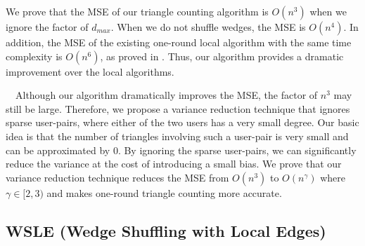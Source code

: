We prove that the MSE of our triangle counting algorithm is
$O(n^3)$ when we ignore the factor of $d_{max}$.
When we do not shuffle wedges, the
MSE is
$O(n^4)$.
In addition, the MSE of the existing one-round local algorithm \cite{Imola_USENIX22} with the same time complexity is $O(n^6)$, as proved in
.
Thus, our
algorithm
provides a dramatic improvement over the local algorithms.

\smallskip
{}~~Although our
algorithm
dramatically
improves
the MSE, the factor of $n^3$ may still be large.
Therefore, we propose a variance reduction technique that ignores sparse user-pairs, where either of the two users has a very small degree.
Our basic idea is that the number of triangles involving such a user-pair is very small
and can be approximated by $0$.
By ignoring the sparse user-pairs, we can significantly reduce the variance at the cost of introducing a small bias.
We prove that our variance reduction technique reduces the MSE from $O(n^3)$ to $O(n^\gamma)$ where $\gamma\in[2,3)$ and makes one-round triangle counting more accurate.


\subsection{WSLE (Wedge Shuffling with Local Edges)}
\label{chap3-sub:wedge}

